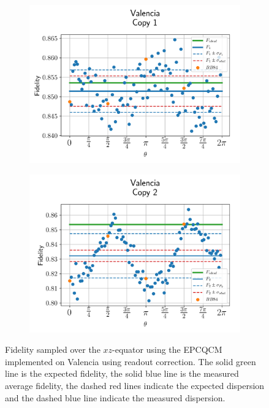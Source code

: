 \begin{figure}[H]
  \centering
  \begin{subfigure}{.5\textwidth}
    \centering
    \includegraphics[width=\textwidth]{Figures/Economical/IBM/OnlyEquator/results_corrected_valencia_copy1.png}
    \label{fig:epc_corrected_valencia_equator_1}
  \end{subfigure}%
  \begin{subfigure}{.5\textwidth}
    \centering
    \includegraphics[width=\textwidth]{Figures/Economical/IBM/OnlyEquator/results_corrected_valencia_copy2.png}
    \label{fig:epc_corrected_valencia_equator_2}
  \end{subfigure}
  \vspace{-0.5cm}
  \caption{Fidelity sampled over the $xz$-equator using the EPCQCM implemented on Valencia using readout correction. The solid green line is the expected fidelity, the solid blue line is the measured average fidelity, the dashed red lines indicate the expected dispersion and the dashed blue line indicate the measured dispersion.}
  \label{fig:epc_corrected_valencia_equator}
\end{figure}

